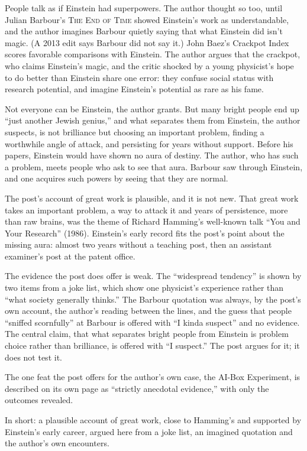 \begin{afterword}
\summaryhead

People talk as if Einstein had superpowers. The author thought so too, until Julian Barbour's \textsc{The End of Time} showed Einstein's work as understandable, and the author imagines Barbour quietly saying that what Einstein did isn't magic. (A 2013 edit says Barbour did not say it.) John Baez's Crackpot Index scores favorable comparisons with Einstein. The author argues that the crackpot, who claims Einstein's magic, and the critic shocked by a young physicist's hope to do better than Einstein share one error: they confuse social status with research potential, and imagine Einstein's potential as rare as his fame.

Not everyone can be Einstein, the author grants. But many bright people end up ``just another Jewish genius,'' and what separates them from Einstein, the author suspects, is not brilliance but choosing an important problem, finding a worthwhile angle of attack, and persisting for years without support. Before his papers, Einstein would have shown no aura of destiny. The author, who has such a problem, meets people who ask to see that aura. Barbour saw through Einstein, and one acquires such powers by seeing that they are normal.

\responsehead

The post's account of great work is plausible, and it is not new. That great work takes an important problem, a way to attack it and years of persistence, more than raw brains, was the theme of Richard Hamming's well-known talk ``You and Your Research'' (1986). Einstein's early record fits the post's point about the missing aura: almost two years without a teaching post, then an assistant examiner's post at the patent office.

The evidence the post does offer is weak. The ``widespread tendency'' is shown by two items from a joke list, which show one physicist's experience rather than ``what society generally thinks.'' The Barbour quotation was always, by the post's own account, the author's reading between the lines, and the guess that people ``sniffed scornfully'' at Barbour is offered with ``I kinda suspect'' and no evidence. The central claim, that what separates bright people from Einstein is problem choice rather than brilliance, is offered with ``I suspect.'' The post argues for it; it does not test it.

The one feat the post offers for the author's own case, the AI-Box Experiment, is described on its own page as ``strictly anecdotal evidence,'' with only the outcomes revealed.

In short: a plausible account of great work, close to Hamming's and supported by Einstein's early career, argued here from a joke list, an imagined quotation and the author's own encounters.
\end{afterword}
